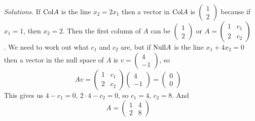     \ifnum {} {\color{DarkBlue} \textit{Solutions.} 
    If $\text{Col} A$ is the line $x_2=2x_1$ then a vector in $\text{Col} A$ is $\begin{pmatrix} 1\\2\end{pmatrix}$ because if $x_1=1$, then $x_2=2$. Then the first column of $A$ can be $\begin{pmatrix} 1\\2\end{pmatrix}$ or $A = \begin{pmatrix} 1&c_1\\2&c_2\end{pmatrix}$. We need to work out what $c_1$ and $c_2$ are, but if $\text{Null} A$ is the line $x_1+4x_2=0$ then a vector in the null space of $A$ is $v = \begin{pmatrix} 4\\-1\end{pmatrix}$, so $$Av = \begin{pmatrix}1&c_1\\2&c_2 \end{pmatrix}\begin{pmatrix} 4\\-1\end{pmatrix} = \begin{pmatrix} 0\\0\end{pmatrix}$$ This gives us $4-c_1 = 0$, $2\cdot 4-c_2 = 0$, so $c_1 = 4$, $c_2 = 8$. And
    $$A = \begin{pmatrix} 1&4\\2&8\end{pmatrix}$$ 

    } 
   \else 
      
